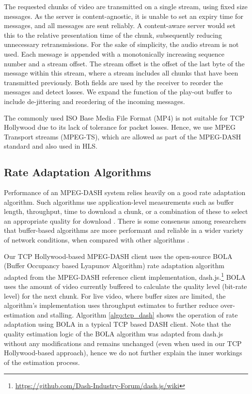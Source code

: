 The requested chunks of video are transmitted on a single stream, using fixed size
messages. As the server is content-agnostic, it is unable to set an expiry time for messages, and
all messages are sent reliably. A content-aware server would set this to the relative presentation time of the chunk, subsequently reducing unnecessary retransmissions. For the sake of simplicity, the audio stream is not used. Each message is appended with a monotonically increasing sequence number and a stream offset. The stream offset is the offset of the last byte of the message within this stream, where a stream includes all chunks that have been transmitted
previously. Both fields are used by the receiver to reorder the messages and detect
losses. We expand the function of the play-out buffer to include de-jittering and
reordering of the incoming messages.

The commonly used ISO Base Media File Format (MP4) is not suitable for TCP Hollywood due to its lack of tolerance for packet losses. Hence, we use MPEG Transport streams (MPEG-TS), which are allowed as part of the MPEG-DASH standard and also used in HLS.

\subsection{Rate Adaptation Algorithms}

Performance of an MPEG-DASH system relies heavily on a good rate adaptation algorithm.
Such algorithms use application-level measurements such as buffer length, throughput, time to
download a chunk, or a combination of these to select an appropriate quality for
download \cite{beben2016abma+, spiteri2016bola, li2014probe}. There is some consensus
among researchers that buffer-based algorithms are more performant and reliable in a wider
variety of network conditions, when compared with other algorithms 
\cite{huang2015buffer, karagkioules2017comparative}.

Our TCP Hollywood-based MPEG-DASH client uses the open-source BOLA 
(Buffer Occupancy based Lyapunov Algorithm) rate adaptation algorithm \cite{spiteri2016bola} adapted from the MPEG-DASH reference
client implementation, dash.js.\footnote{\url{https://github.com/Dash-Industry-Forum/dash.js/wiki}}
BOLA uses the amount of video currently buffered to calculate the quality level (bit-rate
level) for the next chunk. For live video, where buffer sizes are limited, the algorithm's implementation 
uses throughput estimates to further reduce over-estimation and stalling. Algorithm \ref{algo:tcp_dash} shows the operation of rate adaptation using BOLA in a typical TCP based DASH client. Note that the quality estimation logic of the BOLA algorithm was adapted from dash.js without any modifications and remains unchanged (even when used in our TCP Hollywood-based approach), hence we do not further explain the inner workings of the estimation process. 


